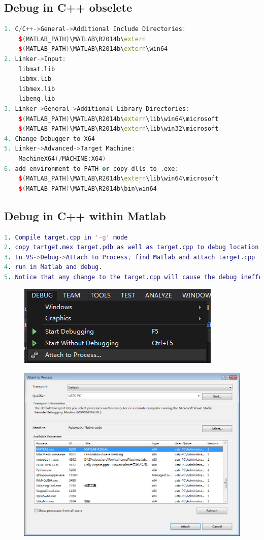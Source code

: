 \documentclass[10pt,a4paper]{article}
\begin{document}
\subsection{Debug in C++ obselete}
\begin{lstlisting}[language=c++]
1. C/C++->General->Additional Include Directories:
	$(MATLAB_PATH)\MATLAB\R2014b\extern
	$(MATLAB_PATH)\MATLAB\R2014b\extern\win64
2. Linker->Input:
	libmat.lib
	libmx.lib
	libmex.lib
	libeng.lib
3. Linker->General->Additional Library Directories:
	$(MATLAB_PATH)\MATLAB\R2014b\extern\lib\win64\microsoft
	$(MATLAB_PATH)\MATLAB\R2014b\extern\lib\win32\microsoft
4. Change Debugger to X64
5. Linker->Advanced->Target Machine:
	MachineX64(/MACHINE:X64)
6. add environment to PATH or copy dlls to .exe:
	$(MATLAB_PATH)\MATLAB\R2014b\extern\lib\win64\microsoft
	$(MATLAB_PATH)\MATLAB\R2014b\bin\win64
\end{lstlisting}


\subsection{Debug in C++ within Matlab}
\begin{lstlisting}[language=matlab]
1. Compile target.cpp in '-g' mode 
2. copy tartget.mex target.pdb as well as target.cpp to debug location
3. In VS->Debug->Attach to Process, find Matlab and attach target.cpp file to matlab.
4. run in Matlab and debug.
5. Notice that any change to the target.cpp will cause the debug ineffective.
\end{lstlisting}

\begin{figure}[h]
	\centering
	\includegraphics[width=0.7\linewidth]{attach_to_matlab}
	\caption{}
	\label{fig:attachtomatlab}
\end{figure}

\begin{figure}[h]
\centering
\includegraphics[width=0.7\linewidth]{attach_to_matlab2}
\caption{}
\label{fig:attachtomatlab2}
\end{figure}
\end{document}
